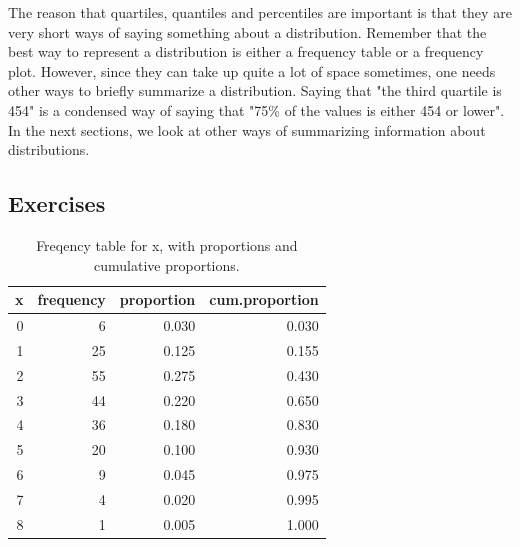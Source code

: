 \documentclass[]{book}\usepackage[]{graphicx}\usepackage[]{color}
\begin{document}
The reason that quartiles, quantiles and percentiles are important is that they are very short ways of saying something about a distribution. Remember that the best way to represent a distribution is either a frequency table or a frequency plot. However, since they can take up quite a lot of space sometimes, one needs other ways to briefly summarize a distribution. Saying that "the third quartile is 454" is a condensed way of saying that "75\% of the values is either 454 or lower". In the next sections, we look at other ways of summarizing information about distributions.

\subsection{Exercises}

\begin{table}[ht]
\centering
\caption{Freqency table for x, with proportions and cumulative proportions.} 
\label{tab:frequency_2}
\begin{tabular}{rrrr}
  \hline
x & frequency & proportion & cum.proportion \\ 
  \hline
   0 &    6 & 0.030 & 0.030 \\ 
     1 &   25 & 0.125 & 0.155 \\ 
     2 &   55 & 0.275 & 0.430 \\ 
     3 &   44 & 0.220 & 0.650 \\ 
     4 &   36 & 0.180 & 0.830 \\ 
     5 &   20 & 0.100 & 0.930 \\ 
     6 &    9 & 0.045 & 0.975 \\ 
     7 &    4 & 0.020 & 0.995 \\ 
     8 &    1 & 0.005 & 1.000 \\ 
   \hline
\end{tabular}
\end{table}
\end{document}
